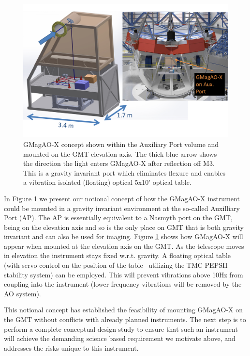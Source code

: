 \documentclass[12pt,preprint]{aastex}
\begin{document}
\begin{figure}[h!]
\centering
\includegraphics[width=6in]{figures/GMagAOX__fig4_no_labels_V2.png}
\vspace{-0.2in}
\caption{ GMagAO-X concept shown within the Auxiliary Port volume and mounted on the GMT elevation axis. The thick blue arrow shows the direction the light enters GMagAO-X after reflection off M3. This is a gravity invariant port which eliminates flexure and enables a vibration isolated (floating) optical 5x10' optical table. \label{fig:ap}}
\vspace{-0.1in}
\end{figure}

In Figure \ref{fig:ap} we present our notional concept of how the GMagAO-X instrument could be mounted in a gravity invariant environment at the so-called Auxilliary Port (AP). The AP is essentially equivalent to a Nasmyth port on the GMT, being on the elevation axis and so is the only place on GMT that is both gravity invariant and can also be used for imaging.  Figure \ref{fig:ap} shows how GMagAO-X will appear when mounted at the elevation axis on the GMT. As the telescope moves in elevation the instrument stays fixed w.r.t. gravity. A floating optical table (with servo control on the position of the table-- utilizing the TMC PEPSII stability system) can be employed.  This will prevent vibrations above 10Hz from coupling into the instrument (lower frequency vibrations will be removed by the AO system). 

This notional concept has established the feasibility of mounting GMagAO-X on the GMT without conflicts with already planned instruments.  The next step is to perform a complete conceptual design study to ensure that such an instrument will achieve the demanding science based requirement we motivate above, and addresses the risks unique to this instrument. 
\end{document}
